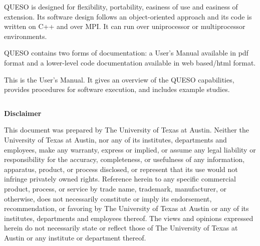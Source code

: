 QUESO is designed for flexibility, portability, easiness of use and
easiness of extension. Its software design follows an object-oriented
approach and its code is written on C++ and over MPI. It can run over
uniprocessor or multiprocessor environments.

QUESO contains two forms of documentation:
a User's Manual available in pdf format
and
a lower-level code documentation available in web based/html format.

This is the User's Manual.
It gives an overview of the QUESO capabilities,
provides procedures for software execution, and includes example studies.

\clearpage
$~$\\

\clearpage
\centerline{\Large\bf Disclaimer}
$~$\\
    This document was prepared
    by The University of Texas at Austin.
    Neither the University of Texas
    at Austin, nor any of its institutes, departments and employees, make any warranty, express or implied,
    or assume any legal liability or responsibility for the accuracy, completeness, or
    usefulness of any information, apparatus, product, or process disclosed, or represent
    that its use would not infringe privately owned rights. Reference herein to any specific
    commercial product, process, or service by trade name, trademark, manufacturer, or otherwise,
    does not necessarily constitute or imply its endorsement, recommendation, or favoring by
    The University of Texas at Austin or any of its institutes, departments and employees thereof.
    The views and opinions expressed herein do not necessarily state or reflect
    those of The University of Texas at Austin or any institute or department
    thereof.

\clearpage
$~$\\

\clearpage
{\markboth{}{}
}
\tableofcontents


